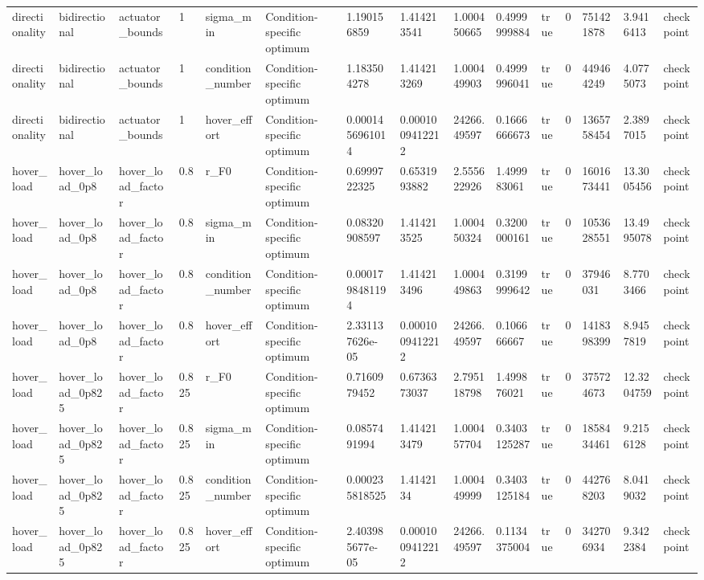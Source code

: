 \begin{tabular}{@{}lllllllllllllll@{}}
directionality & bidirectional & actuator\_bounds & 1 & sigma\_min & Condition-specific optimum & 1.190156859 & 1.414213541 & 1.000450665 & 0.4999999884 & true & 0 & 751421878 & 3.9416413 & checkpoint \\
directionality & bidirectional & actuator\_bounds & 1 & condition\_number & Condition-specific optimum & 1.183504278 & 1.414213269 & 1.000449903 & 0.4999996041 & true & 0 & 449464249 & 4.0775073 & checkpoint \\
directionality & bidirectional & actuator\_bounds & 1 & hover\_effort & Condition-specific optimum & 0.0001456961014 & 0.0001009412212 & 24266.49597 & 0.1666666673 & true & 0 & 1365758454 & 2.3897015 & checkpoint \\
hover\_load & hover\_load\_0p8 & hover\_load\_factor & 0.8 & r\_F0 & Condition-specific optimum & 0.6999722325 & 0.6531993882 & 2.555622926 & 1.499983061 & true & 0 & 1601673441 & 13.3005456 & checkpoint \\
hover\_load & hover\_load\_0p8 & hover\_load\_factor & 0.8 & sigma\_min & Condition-specific optimum & 0.08320908597 & 1.414213525 & 1.000450324 & 0.3200000161 & true & 0 & 1053628551 & 13.4995078 & checkpoint \\
hover\_load & hover\_load\_0p8 & hover\_load\_factor & 0.8 & condition\_number & Condition-specific optimum & 0.0001798481194 & 1.414213496 & 1.000449863 & 0.3199999642 & true & 0 & 37946031 & 8.7703466 & checkpoint \\
hover\_load & hover\_load\_0p8 & hover\_load\_factor & 0.8 & hover\_effort & Condition-specific optimum & 2.331137626e-05 & 0.0001009412212 & 24266.49597 & 0.106666667 & true & 0 & 1418398399 & 8.9457819 & checkpoint \\
hover\_load & hover\_load\_0p825 & hover\_load\_factor & 0.825 & r\_F0 & Condition-specific optimum & 0.7160979452 & 0.6736373037 & 2.795118798 & 1.499876021 & true & 0 & 375724673 & 12.3204759 & checkpoint \\
hover\_load & hover\_load\_0p825 & hover\_load\_factor & 0.825 & sigma\_min & Condition-specific optimum & 0.0857491994 & 1.414213479 & 1.000457704 & 0.3403125287 & true & 0 & 1858434461 & 9.2156128 & checkpoint \\
hover\_load & hover\_load\_0p825 & hover\_load\_factor & 0.825 & condition\_number & Condition-specific optimum & 0.000235818525 & 1.4142134 & 1.000449999 & 0.3403125184 & true & 0 & 442768203 & 8.0419032 & checkpoint \\
hover\_load & hover\_load\_0p825 & hover\_load\_factor & 0.825 & hover\_effort & Condition-specific optimum & 2.403985677e-05 & 0.0001009412212 & 24266.49597 & 0.1134375004 & true & 0 & 342706934 & 9.3422384 & checkpoint \\

\end{tabular}
